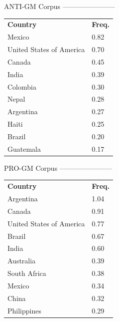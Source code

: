\begin{footnotesize}
ANTI-GM Corpus\newline
-----------------------

\begin{table}[H]
\begin{footnotesize}
\begin{tabular}{ll}

\textbf{Country}         & \textbf{Freq.} \\
Mexico                   & 0.82            \\
United States of America & 0.70           \\
Canada                   & 0.45           \\
India                    & 0.39           \\
Colombia                 & 0.30           \\
Nepal                    & 0.28           \\
Argentina                & 0.27           \\
Haiti                    & 0.25           \\
Brazil                   & 0.20           \\
Guatemala                & 0.17

\end{tabular}
\end{footnotesize}
\end{table}

PRO-GM Corpus\newline
-----------------------

\begin{table}[H]
\begin{footnotesize}
\begin{tabular}{ll}

\textbf{Country}         & \textbf{Freq.} \\
Argentina                & 1.04            \\
Canada                   & 0.91           \\
United States of America & 0.77            \\
Brazil                   & 0.67            \\
India                    & 0.60           \\
Australia                & 0.39           \\
South Africa             & 0.38           \\
Mexico                   & 0.34           \\
China                    & 0.32            \\
Philippines              & 0.29

\end{tabular}
\end{footnotesize}
\end{table}

\end{footnotesize}


